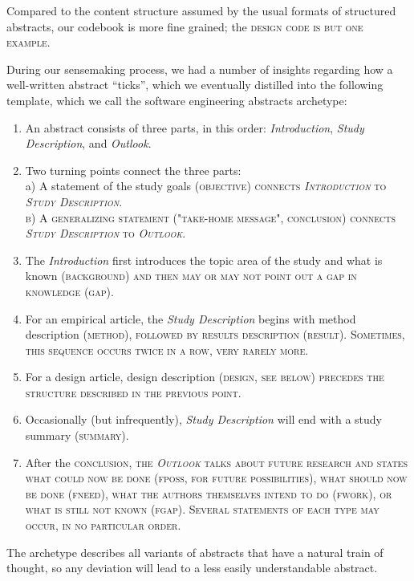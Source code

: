 \documentclass[10pt,journal,compsoc]{IEEEtran}
\newcommand{\Cb}[1]{\bgroup\scshape #1\egroup}  %
\begin{document}
Compared to the content structure assumed by the usual formats of
structured abstracts, our codebook is more fine grained;
the \Cb{design} code is but one example. 

During our sensemaking process, we had a number of insights regarding
how a well-written abstract ``ticks'', which we eventually distilled into
the following template, which we call the software engineering abstracts archetype:

\begin{enumerate}
\item An abstract consists of three parts, in this order:
   \emph{Introduction}, \emph{Study Description}, and \emph{Outlook}. 
\item Two turning points connect the three parts:\\
   a) A statement of the study goals (\Cb{objective}) connects \emph{Introduction} 
      to \emph{Study Description}.\\
   b) A generalizing statement ("take-home message", \Cb{conclusion}) 
     connects \emph{Study Description} to \emph{Outlook}.
\item The \emph{Introduction} first introduces the topic area of the study and what is known (\Cb{background})
   and then may or may not point out a gap in knowledge (\Cb{gap}).
\item For an empirical article, the \emph{Study Description} begins with
   method description (\Cb{method}), followed by results description (\Cb{result}).
   Sometimes, this sequence occurs twice in a row, very rarely more.
\item For a design article, design description (\Cb{design}, see below) precedes the structure
   described in the previous point.
\item Occasionally (but infrequently), \emph{Study Description} will end with a study summary (\Cb{summary}).
\item After the \Cb{conclusion}, the \emph{Outlook} talks about future research and states 
   what could now be done (\Cb{fposs}, for future possibilities),
   what should now be done (\Cb{fneed}),
   what the authors themselves intend to do (\Cb{fwork}), or
   what is still not known (\Cb{fgap}).
   Several statements of each type may occur, in no particular order.
\end{enumerate}

The archetype describes all variants of abstracts that have a natural train of thought,
so any deviation will lead to a less easily understandable abstract.
\end{document}
